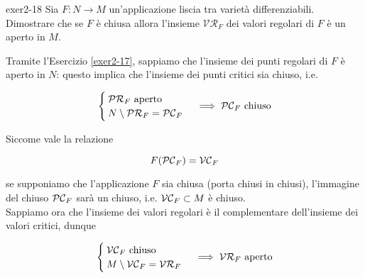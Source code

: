
{exer2-18}
{
Sia $ F : N \to M $ un'applicazione liscia tra varietà differenziabili. Dimostrare che se $ F $ è chiusa allora l'insieme $ \mathcal{VR}_{F} $ dei valori regolari di $ F $ è un aperto in $ M $.
}
{
Tramite l'Esercizio \ref{exer2-17}, sappiamo che l'insieme dei punti regolari di $ F $ è aperto in $ N $: questo implica che l'insieme dei punti critici sia chiuso, i.e.

\begin{equation}
	\begin{cases}
		\PR_{F} \text{ aperto} \\
		N \setminus \PR_{F} = \PC_{F}
	\end{cases} %
	\implies %
	\PC_{F} \text{ chiuso}
\end{equation}

Siccome vale la relazione

\begin{equation}
	F(\mathcal{PC}_{F}) = \mathcal{VC}_{F}
\end{equation}

se supponiamo che l'applicazione $ F $ sia chiusa (porta chiusi in chiusi), l'immagine del chiuso $ \mathcal{PC}_{F} $ sarà un chiuso, i.e. $ \mathcal{VC}_{F} \subset M $ è chiuso. \\
Sappiamo ora che l'insieme dei valori regolari è il complementare dell'insieme dei valori critici, dunque

\begin{equation}
	\begin{cases}
		\VC_{F} \text{ chiuso} \\
		M \setminus \VC_{F} = \VR_{F}
	\end{cases} %
	\implies %
	\VR_{F} \text{ aperto}
\end{equation}
}


